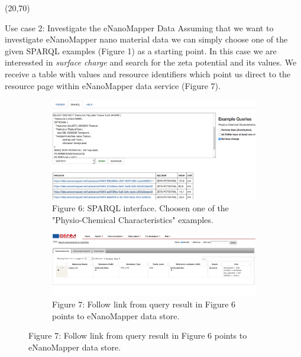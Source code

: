 \documentclass[final]{beamer}
\begin{document}
\begin{frame}{}
        
    \begin{textblock}{62}(20,70)
      \justifying
      \begin{block}{Use case 2: Investigate the eNanoMapper Data}
        Assuming that we want to investigate eNanoMapper nano material data we can simply choose one of the given SPARQL examples (Figure 1) as a starting point. In this case we are interessted in \emph{surface charge} and search for the zeta potential and its values. We receive a table with values and resource identifiers which point us direct to the resource page within eNanoMapper data service (Figure 7).
        \begin{figure}
          \vspace{0.05\textwidth}
          \hspace{-0.1\textwidth}
          \begin{subfigure}[c]{0.3\textwidth}
            \includegraphics[width=\textwidth,keepaspectratio]{onto-use-case-2a.png}
            \caption{Figure 6: SPARQL interface. Choosen one of the "Physio-Chemical Characteristics" examples.}
          \end{subfigure}
          \hspace{0.2\textwidth}
          \begin{subfigure}[c]{0.4\textwidth}
            \includegraphics[width=\textwidth,keepaspectratio]{onto-use-case-2b.png}
            \caption{Figure 7: Follow link from query result in Figure 6 points to eNanoMapper data store.}
          \end{subfigure}
        \end{figure}
      \end{block}
    \end{textblock}
    

\end{frame}
\end{document}
